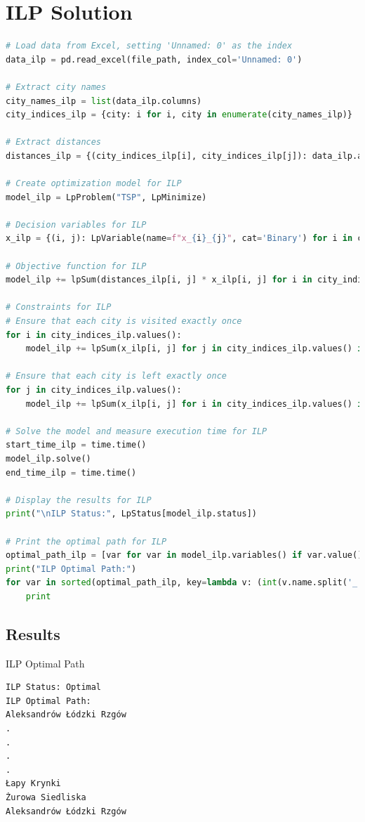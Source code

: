 \section*{ILP Solution}
\begin{center}
    \begin{lstlisting}[language=Python, caption={ILP Solution}]
        # Load data from Excel, setting 'Unnamed: 0' as the index
data_ilp = pd.read_excel(file_path, index_col='Unnamed: 0')

# Extract city names
city_names_ilp = list(data_ilp.columns)
city_indices_ilp = {city: i for i, city in enumerate(city_names_ilp)}

# Extract distances
distances_ilp = {(city_indices_ilp[i], city_indices_ilp[j]): data_ilp.at[i, j] for i in city_names_ilp for j in city_names_ilp if i != j}

# Create optimization model for ILP
model_ilp = LpProblem("TSP", LpMinimize)

# Decision variables for ILP
x_ilp = {(i, j): LpVariable(name=f"x_{i}_{j}", cat='Binary') for i in city_indices_ilp.values() for j in city_indices_ilp.values() if i != j}

# Objective function for ILP
model_ilp += lpSum(distances_ilp[i, j] * x_ilp[i, j] for i in city_indices_ilp.values() for j in city_indices_ilp.values() if i != j), "Minimize Distance"

# Constraints for ILP
# Ensure that each city is visited exactly once
for i in city_indices_ilp.values():
    model_ilp += lpSum(x_ilp[i, j] for j in city_indices_ilp.values() if i != j) == 1, f"VisitOnce_{i}"

# Ensure that each city is left exactly once
for j in city_indices_ilp.values():
    model_ilp += lpSum(x_ilp[i, j] for i in city_indices_ilp.values() if i != j) == 1, f"LeaveOnce_{j}"

# Solve the model and measure execution time for ILP
start_time_ilp = time.time()
model_ilp.solve()
end_time_ilp = time.time()

# Display the results for ILP
print("\nILP Status:", LpStatus[model_ilp.status])

# Print the optimal path for ILP
optimal_path_ilp = [var for var in model_ilp.variables() if var.value() == 1]
print("ILP Optimal Path:")
for var in sorted(optimal_path_ilp, key=lambda v: (int(v.name.split('_')[1]), int(v.name.split('_')[2]))):
    print
    \end{lstlisting}
\end{center}
\subsection*{Results}
ILP Optimal Path
\begin{verbatim}
ILP Status: Optimal
ILP Optimal Path:
Aleksandrów Łódzki Rzgów
.
.
.
.
Łapy Krynki
Żurowa Siedliska
Aleksandrów Łódzki Rzgów
\end{verbatim}

